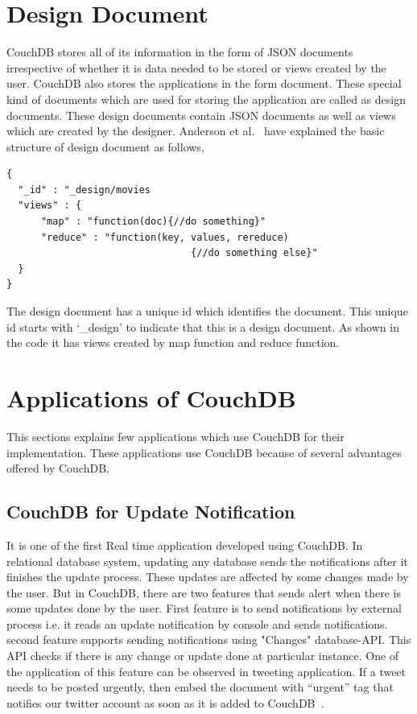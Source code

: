 \documentclass{sig-alternate}
\begin{document}
\section{Design Document}
\label{design document}
CouchDB stores all of its information in the form of JSON documents irrespective of whether it is data needed to be stored or views created by the user. CouchDB also stores the applications in the form document. These special kind of documents which are used for storing the application are called as design documents. These design documents contain JSON documents as well as views which are created by the designer. Anderson et al.~\cite{Anderson:CouchDB} have explained the basic structure of design document as follows,
\begin{verbatim}
{
  "_id" : "_design/movies
  "views" : {
      "map" : "function(doc){//do something}"
      "reduce" : "function(key, values, rereduce)
                                {//do something else}"
  }
}
\end{verbatim}
The design document has a unique id which identifies the document. This unique id starts with `\_design' to indicate that this is a design document. As shown in the code it has views created by map function and reduce function.

\section{Applications of CouchDB}
\label{applications}
This sections explains few applications which use CouchDB for their implementation. These applications use CouchDB because of several advantages offered by CouchDB.
\subsection{CouchDB for Update Notification}
\label{update notification}
It is one of the first Real time application developed using CouchDB. In relational database system, updating any database sends the notifications after it finishes the update process. These updates are affected by some changes made by the user. But in CouchDB,  there are two features that sends alert when there is some updates done by the user. First feature is to  send notifications by external process i.e. it reads an update notification by console and sends notifications. second feature supports sending notifications using "Changes" database-API.  This API checks if there is any change or update done at particular instance. One of the application of this feature can be observed in tweeting application. If a tweet needs to be posted urgently, then embed the document with ``urgent'' tag that notifies our twitter account as soon as it is added to CouchDB~\cite{twit}.
\end{document}
